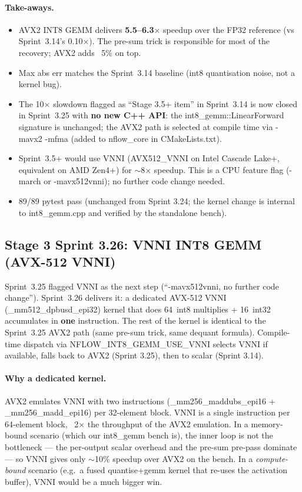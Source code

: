 \documentclass[10pt,twocolumn]{article}
\renewcommand{\texttt}[1]{{\normalfont\ttfamily #1}\normalfont\rmfamily}
\begin{document}
\paragraph{Take-aways.}
\begin{itemize}
\item AVX2 INT8 GEMM delivers \textbf{5.5--6.3$\times$}
speedup over the FP32 reference (vs Sprint~3.14's
0.10$\times$).  The pre-sum trick is responsible
for most of the recovery; AVX2 adds ~5\% on top.
\item Max abs err matches the Sprint~3.14 baseline
(int8 quantisation noise, not a kernel bug).
\item The 10$\times$ slowdown flagged as
``Stage 3.5+ item'' in Sprint~3.14 is now closed
in Sprint~3.25 with \textbf{no new C++ API}: the
\texttt{int8\_gemm::LinearForward} signature is
unchanged; the AVX2 path is selected at compile
time via \texttt{-mavx2 -mfma} (added to
\texttt{nflow\_core} in \texttt{CMakeLists.txt}).
\item Sprint~3.5+ would use VNNI
(\texttt{AVX512\_VNNI} on Intel Cascade Lake+,
equivalent on AMD Zen4+) for $\sim$8$\times$
speedup.  This is a CPU feature flag (\texttt{-march}
or \texttt{-mavx512vnni}); no further code change
needed.
\item 89/89 pytest pass (unchanged from Sprint
3.24; the kernel change is internal to
\texttt{int8\_gemm.cpp} and verified by the
standalone bench).
\end{itemize}

\subsection{Stage 3 Sprint 3.26: VNNI INT8 GEMM (AVX-512 VNNI)}
\label{sec:vnni-int8-gemm}

Sprint~3.25 flagged VNNI as the next step
(``\texttt{-mavx512vnni}, no further code change'').
Sprint~3.26 delivers it: a dedicated AVX-512
VNNI (\texttt{\_mm512\_dpbusd\_epi32}) kernel
that does 64~int8 multiplies + 16~int32
accumulates in \textbf{one} instruction.  The
rest of the kernel is identical to the Sprint~3.25
AVX2 path (same pre-sum trick, same dequant
formula).  Compile-time dispatch via
\texttt{NFLOW\_INT8\_GEMM\_USE\_VNNI} selects
VNNI if available, falls back to AVX2 (Sprint
3.25), then to scalar (Sprint 3.14).

\paragraph{Why a dedicated kernel.}
AVX2 emulates VNNI with two instructions
(\texttt{\_mm256\_maddubs\_epi16} +
\texttt{\_mm256\_madd\_epi16}) per 32-element
block.  VNNI is a single instruction per
64-element block, ~2$\times$ the throughput
of the AVX2 emulation.  In a memory-bound
scenario (which our \texttt{int8\_gemm}
bench is), the inner loop is not the bottleneck
--- the per-output scalar overhead and the
pre-sum pre-pass dominate --- so VNNI gives
only $\sim$10\% speedup over AVX2 on the bench.
In a \emph{compute-bound} scenario (e.g.\ a fused
quantise+gemm kernel that re-uses the activation
buffer), VNNI would be a much bigger win.
\end{document}
